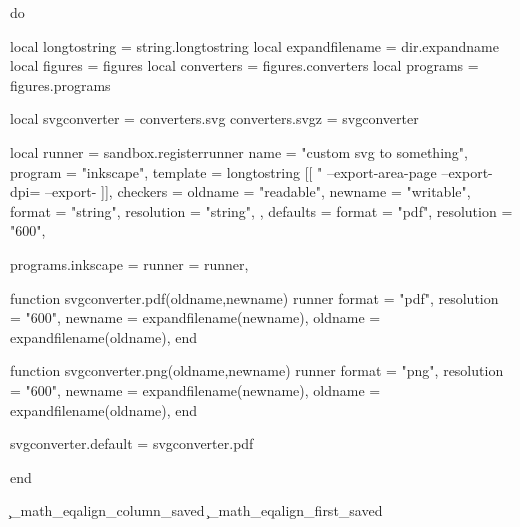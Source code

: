 \startluacode
do

    local longtostring      = string.longtostring
    local expandfilename    = dir.expandname
    local figures           = figures
    local converters        = figures.converters
    local programs          = figures.programs

    local svgconverter = converters.svg
    converters.svgz    = svgconverter

    local runner = sandbox.registerrunner {
        name     = "custom svg to something",
        program  = "inkscape",
        template = longtostring [[
            "%
            --export-area-page
            --export-dpi=%
            --export-%
        ]],
        checkers = {
            oldname    = "readable",
            newname    = "writable",
            format     = "string",
            resolution = "string",
        },
        defaults = {
            format     = "pdf",
            resolution = "600",
        }
    }

    programs.inkscape = {
        runner = runner,
    }

    function svgconverter.pdf(oldname,newname)
        runner {
            format     = "pdf",
            resolution = "600",
            newname    = expandfilename(newname),
            oldname    = expandfilename(oldname),
        }
    end

    function svgconverter.png(oldname,newname)
        runner {
            format     = "png",
            resolution = "600",
            newname    = expandfilename(newname),
            oldname    = expandfilename(oldname),
        }
    end

    svgconverter.default = svgconverter.pdf

end
\stopluacode


\unprotect
\newcount\c_math_eqalign_column_saved
\newcount\c_math_eqalign_first_saved

